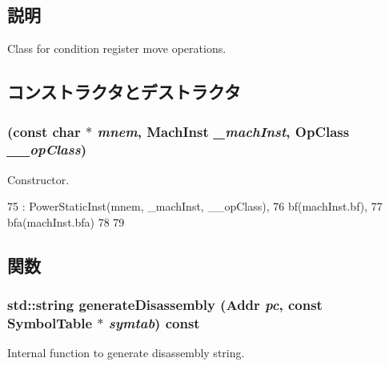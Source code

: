 \subsection{説明}
Class for condition register move operations. 

\subsection{コンストラクタとデストラクタ}
\hypertarget{classPowerISA_1_1CondMoveOp_a65b2deeb0b644289fd1bb06b919e42f7}{
\subsubsection[{CondMoveOp}]{ (const char $\ast$ {\em mnem}, \/  {\bf MachInst} {\em \_\-machInst}, \/  OpClass {\em \_\-\_\-opClass})}}
\label{classPowerISA_1_1CondMoveOp_a65b2deeb0b644289fd1bb06b919e42f7}


Constructor. 


\begin{DoxyCode}
75       : PowerStaticInst(mnem, _machInst, __opClass),
76         bf(machInst.bf),
77         bfa(machInst.bfa)
78     {
79     }
\end{DoxyCode}


\subsection{関数}
\hypertarget{classPowerISA_1_1CondMoveOp_a95d323a22a5f07e14d6b4c9385a91896}{
\subsubsection[{generateDisassembly}]{\setlength{\rightskip}{0pt plus 5cm}std::string generateDisassembly ({\bf Addr} {\em pc}, \/  const SymbolTable $\ast$ {\em symtab}) const}}
\label{classPowerISA_1_1CondMoveOp_a95d323a22a5f07e14d6b4c9385a91896}
Internal function to generate disassembly string. 

